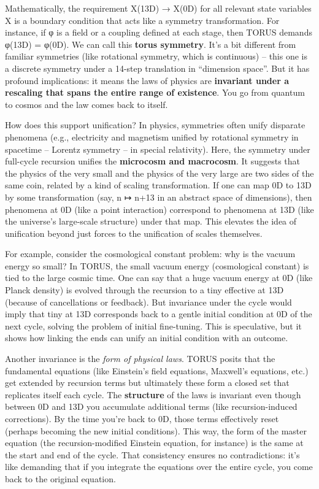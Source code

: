 \documentclass[
]{article}
\begin{document}
Mathematically, the requirement X(13D) → X(0D) for all relevant state
variables X is a boundary condition that acts like a symmetry
transformation\hspace{0pt}. For instance, if φ is a field or a coupling
defined at each stage, then TORUS demands φ(13D) = φ(0D). We can call
this \textbf{torus symmetry}. It's a bit different from familiar
symmetries (like rotational symmetry, which is continuous) -- this one
is a discrete symmetry under a 14-step translation in ``dimension
space''. But it has profound implications: it means the laws of physics
are \textbf{invariant under a rescaling that spans the entire range of
existence}. You go from quantum to cosmos and the law comes back to
itself.

How does this support unification? In physics, symmetries often unify
disparate phenomena (e.g., electricity and magnetism unified by
rotational symmetry in spacetime -- Lorentz symmetry -- in special
relativity). Here, the symmetry under full-cycle recursion unifies the
\textbf{microcosm and macrocosm}. It suggests that the physics of the
very small and the physics of the very large are two sides of the same
coin, related by a kind of scaling transformation. If one can map 0D to
13D by some transformation (say, n ↦ n+13 in an abstract space of
dimensions), then phenomena at 0D (like a point interaction) correspond
to phenomena at 13D (like the universe's large-scale structure) under
that map. This elevates the idea of unification beyond just forces to
the unification of scales themselves.

For example, consider the cosmological constant problem: why is the
vacuum energy so small? In TORUS, the small vacuum energy (cosmological
constant) is tied to the large cosmic time. One can say that a huge
vacuum energy at 0D (like Planck density) is evolved through the
recursion to a tiny effective \Lambda at 13D (because of cancellations or
feedback). But invariance under the cycle would imply that tiny \Lambda at 13D
corresponds back to a gentle initial condition at 0D of the next cycle,
solving the problem of initial fine-tuning. This is speculative, but it
shows how linking the ends can unify an initial condition with an
outcome.

Another invariance is the \emph{form of physical laws}. TORUS posits
that the fundamental equations (like Einstein's field equations,
Maxwell's equations, etc.) get extended by recursion terms but
ultimately these form a closed set that replicates itself each cycle.
The \textbf{structure} of the laws is invariant even though between 0D
and 13D you accumulate additional terms (like recursion-induced
corrections). By the time you're back to 0D, those terms effectively
reset (perhaps becoming the new initial conditions). This way, the form
of the master equation (the recursion-modified Einstein equation, for
instance) is the same at the start and end of the cycle\hspace{0pt}.
That consistency ensures no contradictions: it's like demanding that if
you integrate the equations over the entire cycle, you come back to the
original equation.
\end{document}

